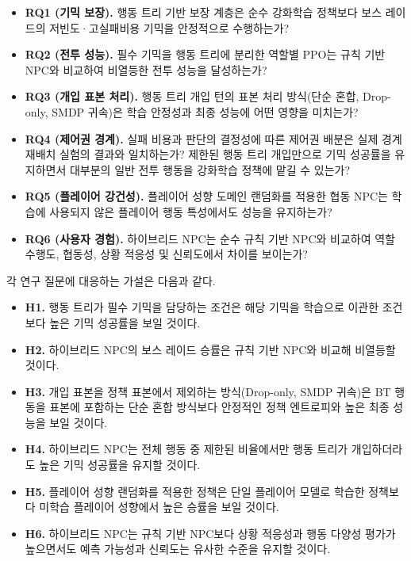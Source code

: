 \documentclass[12pt]{article}      %
\begin{document}
\begin{itemize}[leftmargin=0.5in]
\item \textbf{RQ1 (기믹 보장).} 행동 트리 기반 보장 계층은 순수 강화학습
정책보다 보스 레이드의 저빈도·고실패비용 기믹을 안정적으로 수행하는가?
\item \textbf{RQ2 (전투 성능).} 필수 기믹을 행동 트리에 분리한 역할별 PPO는 규칙
기반 NPC와 비교하여 비열등한 전투 성능을 달성하는가?
\item \textbf{RQ3 (개입 표본 처리).} 행동 트리 개입 턴의 표본 처리 방식(단순
혼합, Drop-only, SMDP 귀속)은 학습 안정성과 최종 성능에 어떤 영향을 미치는가?
\item \textbf{RQ4 (제어권 경계).} 실패 비용과 판단의 결정성에 따른 제어권
배분은 실제 경계 재배치 실험의 결과와 일치하는가? 제한된 행동 트리 개입만으로
기믹 성공률을 유지하면서 대부분의 일반 전투 행동을 강화학습 정책에 맡길 수
있는가?
\item \textbf{RQ5 (플레이어 강건성).} 플레이어 성향 도메인 랜덤화를 적용한 협동
NPC는 학습에 사용되지 않은 플레이어 행동 특성에서도 성능을 유지하는가?
\item \textbf{RQ6 (사용자 경험).} 하이브리드 NPC는 순수 규칙 기반 NPC와 비교하여
역할 수행도, 협동성, 상황 적응성 및 신뢰도에서 차이를 보이는가?
\end{itemize}

각 연구 질문에 대응하는 가설은 다음과 같다.

\begin{itemize}[leftmargin=0.5in]
\item \textbf{H1.} 행동 트리가 필수 기믹을 담당하는 조건은 해당 기믹을 학습으로
이관한 조건보다 높은 기믹 성공률을 보일 것이다.
\item \textbf{H2.} 하이브리드 NPC의 보스 레이드 승률은 규칙 기반 NPC와 비교해
비열등할 것이다.
\item \textbf{H3.} 개입 표본을 정책 표본에서 제외하는 방식(Drop-only, SMDP
귀속)은 BT 행동을 표본에 포함하는 단순 혼합 방식보다 안정적인 정책 엔트로피와
높은 최종 성능을 보일 것이다.
\item \textbf{H4.} 하이브리드 NPC는 전체 행동 중 제한된 비율에서만 행동 트리가
개입하더라도 높은 기믹 성공률을 유지할 것이다.
\item \textbf{H5.} 플레이어 성향 랜덤화를 적용한 정책은 단일 플레이어 모델로
학습한 정책보다 미학습 플레이어 성향에서 높은 승률을 보일 것이다.
\item \textbf{H6.} 하이브리드 NPC는 규칙 기반 NPC보다 상황 적응성과 행동 다양성
평가가 높으면서도 예측 가능성과 신뢰도는 유사한 수준을 유지할 것이다.
\end{itemize}
\end{document}
